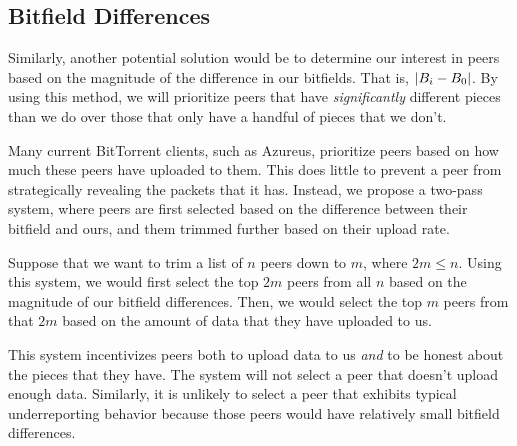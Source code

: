 \subsection{Bitfield Differences}

Similarly, another potential solution would be to determine our interest in peers based on the magnitude of the difference in our bitfields. That is, $\lvert B_i - B_0\rvert$. By using this method, we will prioritize peers that have \emph{significantly} different pieces than we do over those that only have a handful of pieces that we don't.

Many current BitTorrent clients, such as Azureus, prioritize peers based on how much these peers have uploaded to them. This does little to prevent a peer from strategically revealing the packets that it has. Instead, we propose a two-pass system, where peers are first selected based on the difference between their bitfield and ours, and them trimmed further based on their upload rate.

Suppose that we want to trim a list of $n$ peers down to $m$, where $2m \leq n$. Using this system, we would first select the top $2m$ peers from all $n$ based on the magnitude of our bitfield differences. Then, we would select the top $m$ peers from that $2m$ based on the amount of data that they have uploaded to us.

This system incentivizes peers both to upload data to us \emph{and} to be honest about the pieces that they have. The system will not select a peer that doesn't upload enough data. Similarly, it is unlikely to select a peer that exhibits typical underreporting behavior because those peers would have relatively small bitfield differences.
